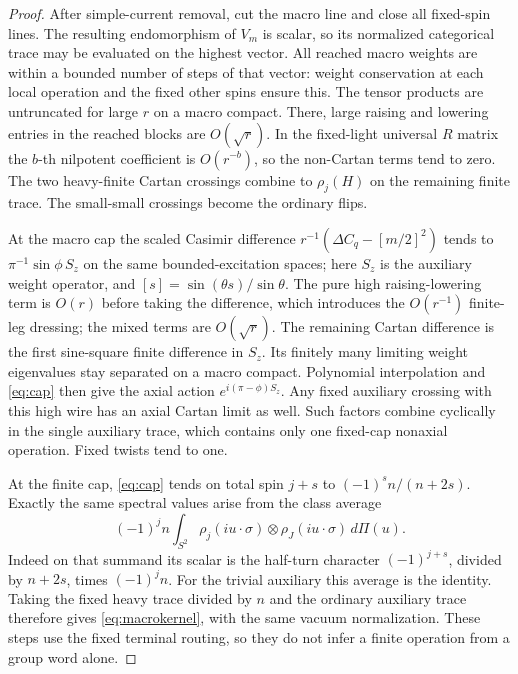 \begin{proof}
After simple-current removal, cut the macro line and close all fixed-spin lines. The resulting endomorphism of \(V_m\) is scalar, so its normalized categorical trace may be evaluated on the highest vector. All reached macro weights are within a bounded number of steps of that vector: weight conservation at each local operation and the fixed other spins ensure this. The tensor products are untruncated for large \(r\) on a macro compact. There, large raising and lowering entries in the reached blocks are \(O(\sqrt r)\). In the fixed-light universal \(R\) matrix the \(b\)-th nilpotent coefficient is \(O(r^{-b})\), so the non-Cartan terms tend to zero. The two heavy-finite Cartan crossings combine to \(\rho_j(H)\) on the remaining finite trace. The small-small crossings become the ordinary flips.

At the macro cap the scaled Casimir difference
\(r^{-1}(\Delta C_q-[m/2]^2)\) tends to
\(\pi^{-1}\sin\phi\, S_z\) on the same bounded-excitation spaces; here \(S_z\) is the auxiliary weight operator, and \([s]=\sin(\theta s)/\sin\theta\). The pure high raising-lowering term is \(O(r)\) before taking the difference, which introduces the \(O(r^{-1})\) finite-leg dressing; the mixed terms are \(O(\sqrt r)\). The remaining Cartan difference is the first sine-square finite difference in \(S_z\). Its finitely many limiting weight eigenvalues stay separated on a macro compact. Polynomial interpolation and \eqref{eq:cap} then give the axial action \(e^{i(\pi-\phi)S_z}\). Any fixed auxiliary crossing with this high wire has an axial Cartan limit as well. Such factors combine cyclically in the single auxiliary trace, which contains only one fixed-cap nonaxial operation. Fixed twists tend to one.

At the finite cap, \eqref{eq:cap} tends on total spin \(j+s\) to \((-1)^s n/(n+2s)\). Exactly the same spectral values arise from the class average
\[
 (-1)^j n\int_{S^2} \rho_j(iu\cdot\sigma)\otimes
                           \rho_J(iu\cdot\sigma)\,d\Pi(u).
\]
Indeed on that summand its scalar is the half-turn character
\((-1)^{j+s}\), divided by \(n+2s\), times \((-1)^j n\).
For the trivial auxiliary this average is the identity. Taking the fixed heavy trace divided by \(n\) and the ordinary auxiliary trace therefore gives \eqref{eq:macrokernel}, with the same vacuum normalization. These steps use the fixed terminal routing, so they do not infer a finite operation from a group word alone.


\end{proof}
